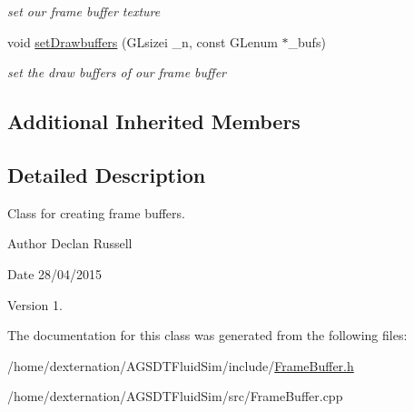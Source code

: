 \begin{DoxyCompactItemize}
\begin{DoxyCompactList}\small\item\em set our frame buffer texture \end{DoxyCompactList}\item 
\hypertarget{class_frame_buffer_a399edc3b7d856ead72e5e04d73223643}{void \hyperlink{class_frame_buffer_a399edc3b7d856ead72e5e04d73223643}{set\-Drawbuffers} (G\-Lsizei \-\_\-n, const G\-Lenum $\ast$\-\_\-bufs)}\label{class_frame_buffer_a399edc3b7d856ead72e5e04d73223643}

\begin{DoxyCompactList}\small\item\em set the draw buffers of our frame buffer \end{DoxyCompactList}\end{DoxyCompactItemize}
\subsection*{Additional Inherited Members}


\subsection{Detailed Description}
Class for creating frame buffers. 

\begin{DoxyAuthor}{Author}
Declan Russell 
\end{DoxyAuthor}
\begin{DoxyDate}{Date}
28/04/2015 
\end{DoxyDate}
\begin{DoxyVersion}{Version}
1. 
\end{DoxyVersion}


The documentation for this class was generated from the following files\-:\begin{DoxyCompactItemize}
\item 
/home/dexternation/\-A\-G\-S\-D\-T\-Fluid\-Sim/include/\hyperlink{_frame_buffer_8h}{Frame\-Buffer.\-h}\item 
/home/dexternation/\-A\-G\-S\-D\-T\-Fluid\-Sim/src/Frame\-Buffer.\-cpp\end{DoxyCompactItemize}

